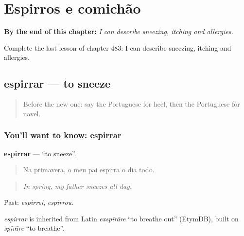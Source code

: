 
\chapter{Espirros e comichão}
\label{ch:pt-espirros-e-comichao}

\begin{chapteropening}
\textbf{By the end of this chapter:} \emph{I can describe sneezing, itching and allergies.}

Complete the last lesson of chapter 483: I can describe sneezing, itching and allergies.
\end{chapteropening}

\section[espirrar]{espirrar — to sneeze}

\label{lesson:PT-C483-espirrar}



\begin{quote}
Before the new one: say the Portuguese for heel, then the Portuguese for navel.
\end{quote}

\subsection*{You'll want to know: espirrar}
\textbf{espirrar} — \textquotedblleft{}to sneeze\textquotedblright{}.

\begin{quote}
Na primavera, o meu pai espirra o dia todo.
\end{quote}

\begin{quote}
\emph{In spring, my father sneezes all day.}
\end{quote}

Past: \emph{espirrei}, \emph{espirrou}.

\begin{cousinweb}
\emph{espirrar} is inherited from Latin \emph{exspīrāre} \textquotedblleft{}to breathe out\textquotedblright{} (EtymDB), built on \emph{spīrāre} \textquotedblleft{}to breathe\textquotedblright{}.
\end{cousinweb}

